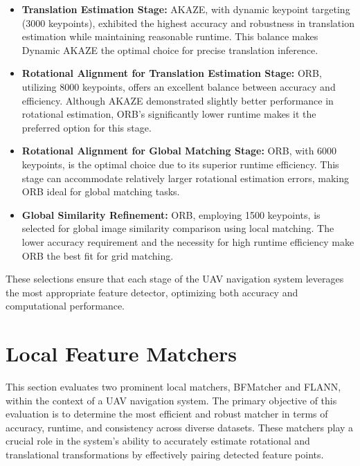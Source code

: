 \begin{itemize}
    \item \textbf{Translation Estimation Stage:} 
    AKAZE, with dynamic keypoint targeting (3000 keypoints), exhibited the highest accuracy and robustness in translation estimation while maintaining reasonable runtime. This balance makes Dynamic AKAZE the optimal choice for precise translation inference.
    
    \item \textbf{Rotational Alignment for Translation Estimation Stage:} 
    ORB, utilizing 8000 keypoints, offers an excellent balance between accuracy and efficiency. Although AKAZE demonstrated slightly better performance in rotational estimation, ORB's significantly lower runtime makes it the preferred option for this stage.
    
    \item \textbf{Rotational Alignment for Global Matching Stage:} 
    ORB, with 6000 keypoints, is the optimal choice due to its superior runtime efficiency. This stage can accommodate relatively larger rotational estimation errors, making ORB ideal for global matching tasks.
    
    \item \textbf{Global Similarity Refinement:} 
    ORB, employing 1500 keypoints, is selected for global image similarity comparison using local matching. The lower accuracy requirement and the necessity for high runtime efficiency make ORB the best fit for grid matching.
\end{itemize}

These selections ensure that each stage of the UAV navigation system leverages the most appropriate feature detector, optimizing both accuracy and computational performance.



\section{Local Feature Matchers}

This section evaluates two prominent local matchers, BFMatcher and FLANN, within the context of a UAV navigation system. The primary objective of this evaluation is to determine the most efficient and robust matcher in terms of accuracy, runtime, and consistency across diverse datasets. These matchers play a crucial role in the system's ability to accurately estimate rotational and translational transformations by effectively pairing detected feature points.

